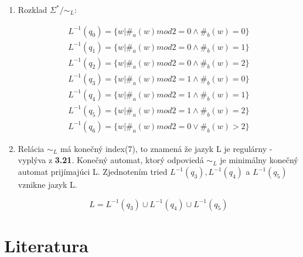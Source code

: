 \documentclass[11pt,a4paper]{article}
\begin{document}
\begin{enumerate}
    \item Rozklad $\Sigma^* / \sim_L$:

    \begin{equation*}
    \begin{aligned}
        L^{-1}(q_0) = \{w | \#_a(w) mod 2 = 0 \land \#_b(w) = 0 \} \\
        L^{-1}(q_1) = \{w | \#_a(w) mod 2 = 0 \land \#_b(w) = 1 \} \\
        L^{-1}(q_2) = \{w | \#_a(w) mod 2 = 0 \land \#_b(w) = 2 \} \\
        L^{-1}(q_3) = \{w | \#_a(w) mod 2 = 1 \land \#_b(w) = 0 \} \\
        L^{-1}(q_4) = \{w | \#_a(w) mod 2 = 1 \land \#_b(w) = 1 \} \\
        L^{-1}(q_5) = \{w | \#_a(w) mod 2 = 1 \land \#_b(w) = 2 \} \\
        L^{-1}(q_6) = \{w | \#_a(w) mod 2 = 0 \lor  \#_b(w) > 2 \}
    \end{aligned}
    \end{equation*}


\item Relácia $\sim_L$ má konečný index(7), to znamená že jazyk L je regulárny - vyplýva z \textbf{3.21}. Konečný automat, ktorý odpoviedá $\sim_L$ je minimálny konečný automat prijímajúci L.  Zjednotením tried $L^{-1}(q_3), L^{-1}(q_4)$ a $L^{-1}(q_5)$ vznikne jazyk L.

    \begin{equation}
        L = L^{-1}(q_3) \cup L^{-1}(q_4) \cup L^{-1}(q_5) 
    \end{equation}




\end{enumerate}































\newpage
\section{Literatura}

\begin{flushleft}
    
    \end{flushleft}
\end{document}
